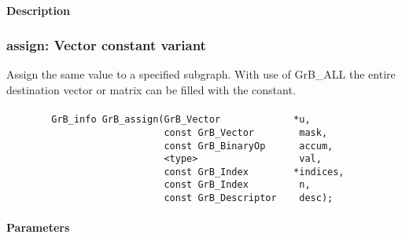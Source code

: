 \paragraph{Description}

\subsubsection{{\sf assign}: Vector constant variant}

Assign the same value to a specified subgraph.  With use of {\sf GrB\_ALL} the entire
destination vector or matrix can be filled with the constant.


\paragraph{\syntax}

\begin{verbatim}
        GrB_info GrB_assign(GrB_Vector             *u,
                            const GrB_Vector        mask,
                            const GrB_BinaryOp      accum,
                            <type>                  val,
                            const GrB_Index        *indices,
                            const GrB_Index         n,
                            const GrB_Descriptor    desc);
\end{verbatim}

\paragraph{Parameters}

